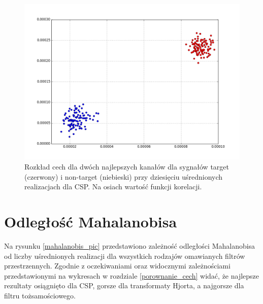 \documentclass[licencjacka,openright]{pracamgr}
\begin{document}
\begin{figure}
\centering
\includegraphics[scale=0.55, trim=10mm 15mm 10mm 18mm, clip=True]{pics/cecha_csp_10.png}
\caption{Rozkład cech dla dwóch najlepszych kanałów dla sygnałów target (czerwony) i non-target (niebieski) przy dziesięciu uśrednionych realizacjach dla CSP. Na osiach wartość funkcji korelacji.}
\label{cecha_csp_10}
\end{figure}

\FloatBarrier
\section{Odległość Mahalanobisa}
Na rysunku \ref{mahalanobis_pic} przedstawiono zależność odległości Mahalanobisa od liczby uśrednionych realizacji dla wszystkich rodzajów omawianych filtrów przestrzennych. Zgodnie z oczekiwaniami oraz widocznymi zależnościami przedstawionymi na wykresach w rozdziale \ref{porownanie_cech} widać, że najlepsze rezultaty osiągnięto dla CSP, gorsze dla transformaty Hjorta, a najgorsze dla filtru tożsamościowego. 
\end{document}
